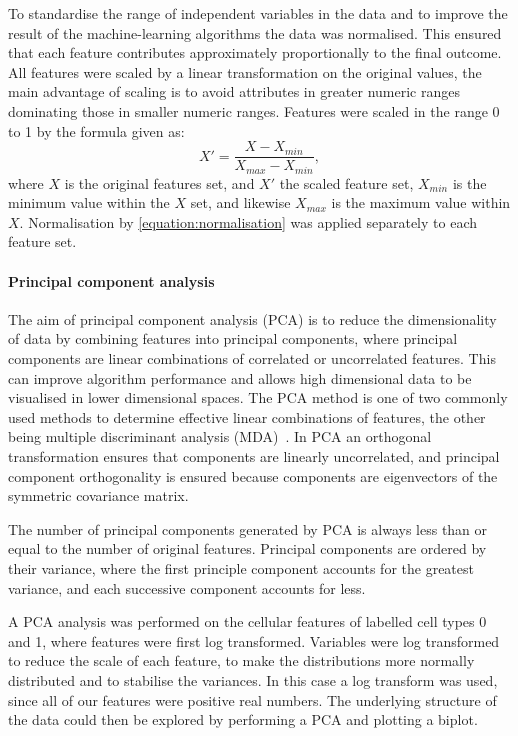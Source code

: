 To standardise the range of independent variables in the data and to improve the result of the machine-learning algorithms the data was normalised. This ensured that each feature contributes approximately proportionally to the final outcome. All features were scaled by a linear transformation on the original values, the main advantage of scaling is to avoid attributes in greater numeric ranges dominating those in smaller numeric ranges. Features were scaled in the range 0 to 1 by the formula given as:
\begin{equation}
	X' = \frac{X - X_{min}}{X_{max}-X_{min}}, 
	\label{equation:normalisation}
\end{equation}
where $X$ is the original features set, and $X'$ the scaled feature set, $X_{min}$ is the minimum value within the $X$ set, and likewise $X_{max}$ is the maximum value within $X$. Normalisation by \autoref{equation:normalisation} was applied separately to each feature set.

\paragraph{Principal component analysis}
The aim of principal component analysis (PCA) is to reduce the dimensionality of data by combining features into principal components, where principal components are linear combinations of correlated or uncorrelated features. This can improve algorithm performance and allows high dimensional data to be visualised in lower dimensional spaces. The PCA method is one of two commonly used methods to determine effective linear combinations of features, the other being multiple discriminant analysis (MDA)~\cite{Duda2000}. In PCA an orthogonal transformation ensures that components are linearly uncorrelated, and principal component orthogonality is ensured because components are eigenvectors of the symmetric covariance matrix.

The number of principal components generated by PCA is always less than or equal to the number of original features. Principal components are ordered by their variance, where the first principle component accounts for the greatest variance, and each successive component accounts for less.

A PCA analysis was performed on the cellular features of labelled cell types 0 and 1, where features were first log transformed. Variables were log transformed to reduce the scale of each feature, to make the distributions more normally distributed and to stabilise the variances. In this case a log transform was used, since all of our features were positive real numbers. The underlying structure of the data could then be explored by performing a PCA and plotting a biplot.

